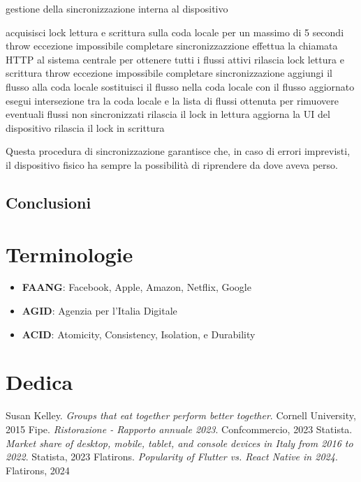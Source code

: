 \documentclass[a4paper, titlepage, 12pt, openright, twoside]{book}
\begin{document}
\begin{algorithm}
\caption{gestione della sincronizzazione interna al dispositivo}
\begin{algorithmic}[1]
\State acquisisci lock lettura e scrittura sulla coda locale per un massimo di 5 secondi
\State throw eccezione impossibile completare sincronizzazzione
\EndIf
\State effettua la chiamata HTTP al sistema centrale per ottenere tutti i flussi attivi
	\State rilascia lock lettura e scrittura
	\State throw eccezione impossibile completare sincronizzazione
\EndIf
{}
		\State aggiungi il flusso alla coda locale
		\State sostituisci il flusso nella coda locale con il flusso aggiornato
	\EndIf
\EndFor
\State esegui intersezione tra la coda locale e la lista di flussi ottenuta per rimuovere eventuali flussi non sincronizzati
\State rilascia il lock in lettura
\State aggiorna la UI del dispositivo
\State rilascia il lock in scrittura
\end{algorithmic}
\end{algorithm}

Questa procedura di sincronizzazione garantisce che, in caso di errori imprevisti, il dispositivo fisico ha sempre la possibilità di riprendere da dove aveva perso.

\section{Conclusioni}

\chapter{Terminologie}\label{chap:terminologie}

\begin{itemize}
	\item \textbf{FAANG}: Facebook, Apple, Amazon, Netflix, Google
	\item \textbf{AGID}: Agenzia per l'Italia Digitale
	\item \textbf{ACID}: Atomicity, Consistency, Isolation, e Durability
\end{itemize}

\chapter{Dedica}\label{chap:dedica}

\begin{thebibliography}{9}
	 Susan Kelley. \textsl{Groups that eat together perform better together}. Cornell University, 2015
	 Fipe. \textsl{Ristorazione - Rapporto annuale 2023}. Confcommercio, 2023
	 Statista. \textsl{Market share of desktop, mobile, tablet, and console devices in Italy from 2016 to 2022}. Statista, 2023
	 Flatirons. \textsl{Popularity of Flutter vs. React Native in 2024}. Flatirons, 2024
\end{thebibliography}
\end{document}
